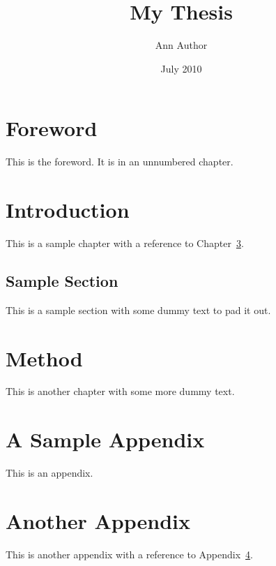 \documentclass[oneside]{scrbook}
\title{My Thesis}
\author{Ann Author}
\date{July 2010}
\begin{document}
\maketitle

\frontmatter
\tableofcontents

\chapter{Foreword}

This is the foreword. It is in an unnumbered chapter.

\mainmatter
\chapter{Introduction}

This is a sample chapter with a reference to Chapter~\ref{ch:method}.

\section{Sample Section}

This is a sample section with some dummy text to pad it out. \lipsum

\chapter{Method}\label{ch:method}

This is another chapter with some more dummy text. \lipsum

\appendix %

\chapter{A Sample Appendix}\label{apd:sample}

This is an appendix. \lipsum

\chapter{Another Appendix}

This is another appendix with a reference to Appendix~\ref{apd:sample}.
\lipsum
\end{document}
